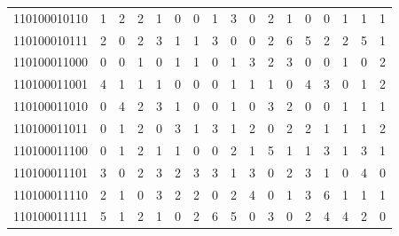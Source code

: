 \documentclass[10pt,a4paper]{article}
\begin{document}
\begin{longtable}{ |c|c|c|c|c|c|c|c|c|c|c|c|c|c|c|c|c| }
    110100010110              & 1                            & 2                                & 2                            & 1                              & 0   & 0   & 1   & 3   & 0   & 2   & 1   & 0   & 0   & 1   & 1   & 1   \\
    110100010111              & 2                            & 0                                & 2                            & 3                              & 1   & 1   & 3   & 0   & 0   & 2   & 6   & 5   & 2   & 2   & 5   & 1   \\
    110100011000              & 0                            & 0                                & 1                            & 0                              & 1   & 1   & 0   & 1   & 3   & 2   & 3   & 0   & 0   & 1   & 0   & 2   \\
    110100011001              & 4                            & 1                                & 1                            & 1                              & 0   & 0   & 0   & 1   & 1   & 1   & 0   & 4   & 3   & 0   & 1   & 2   \\
    110100011010              & 0                            & 4                                & 2                            & 3                              & 1   & 0   & 0   & 1   & 0   & 3   & 2   & 0   & 0   & 1   & 1   & 1   \\
    110100011011              & 0                            & 1                                & 2                            & 0                              & 3   & 1   & 3   & 1   & 2   & 0   & 2   & 2   & 1   & 1   & 1   & 2   \\
    110100011100              & 0                            & 1                                & 2                            & 1                              & 1   & 0   & 0   & 2   & 1   & 5   & 1   & 1   & 3   & 1   & 3   & 1   \\
    110100011101              & 3                            & 0                                & 2                            & 3                              & 2   & 3   & 3   & 1   & 3   & 0   & 2   & 3   & 1   & 0   & 4   & 0   \\
    110100011110              & 2                            & 1                                & 0                            & 3                              & 2   & 2   & 0   & 2   & 4   & 0   & 1   & 3   & 6   & 1   & 1   & 1   \\
    110100011111              & 5                            & 1                                & 2                            & 1                              & 0   & 2   & 6   & 5   & 0   & 3   & 0   & 2   & 4   & 4   & 2   & 0   \\

\end{longtable}
\end{document}
